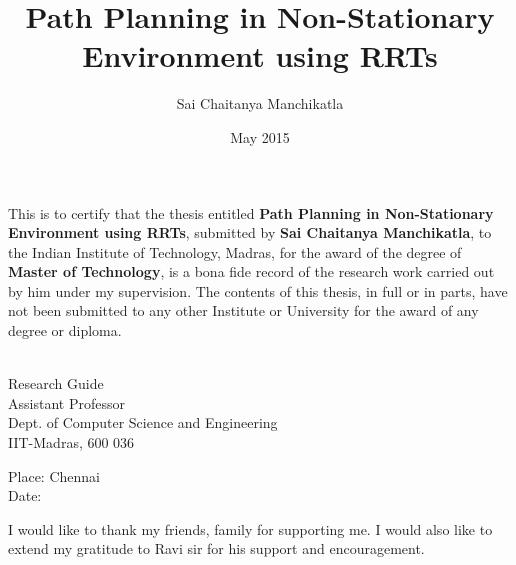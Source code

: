 \documentclass[MTech]{iitmdiss}
\def\thesistitle{Path Planning in Non-Stationary Environment using RRTs}
\def\thesisauthor{Sai Chaitanya Manchikatla}
\begin{document}


\title{\thesistitle}

\author{\thesisauthor}

\date{May 2015}

\begin{singlespace}
\maketitle 
\end{singlespace} 

\certificate

\vspace*{0.5in}

\noindent This is to certify that the thesis entitled {\bf {\thesistitle}}, 
submitted by {\bf {\thesisauthor}}, to the Indian Institute of Technology, 
Madras, for the award of the degree of {\bf Master of Technology}, 
is a bona fide record of the research work carried out by him under my
supervision. The contents of this thesis, in full or in parts, have not been
submitted to any other Institute or University for the award of any degree or
diploma.

\vspace*{1.4in}
\hspace*{-0.25in}
\begin{singlespace}
 \\
\noindent Research Guide \\ 
\noindent Assistant Professor \\
\noindent Dept. of Computer Science and Engineering\\
\noindent IIT-Madras, 600 036 \\
\end{singlespace}
\vspace*{0.20in}
\noindent Place: Chennai\\ 
Date:

\acknowledgements
I would like to thank my friends, family for supporting me. I would also like to extend my gratitude to Ravi sir for his support and encouragement.
\end{document}
